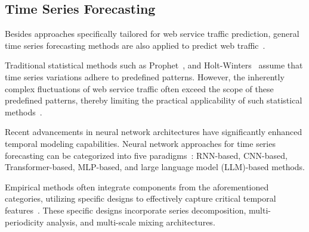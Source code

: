 \subsection{Time Series Forecasting}
Besides approaches specifically tailored for web service traffic prediction, general time series forecasting methods are also applied to predict web traffic~\cite{alharthi2024auto,zou2024optscaler,10457027}.

Traditional statistical methods such as Prophet~\cite{sean2018forecasting}, and Holt-Winters~\cite{hyndman2018forecasting} assume that time series variations adhere to predefined patterns. However, the inherently complex fluctuations of web service traffic often exceed the scope of these predefined patterns, thereby limiting the practical applicability of such statistical methods~\cite{wutimesnet}.

Recent advancements in neural network architectures have significantly enhanced temporal modeling capabilities. Neural network approaches for time series forecasting can be categorized into five paradigms~\cite{wangtimemixer, tan2024language}: RNN-based, CNN-based, Transformer-based, MLP-based, and large language model (LLM)-based methods. 

Empirical methods often integrate components from the aforementioned categories, utilizing specific designs to effectively capture critical temporal features~\cite{wangtimemixer}. These specific designs incorporate series decomposition, multi-periodicity analysis, and multi-scale mixing architectures.

